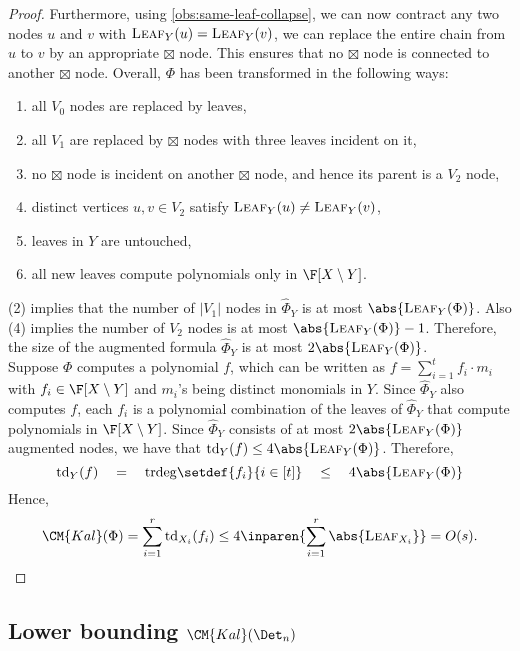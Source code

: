 \begin{proof}
Furthermore, using \autoref{obs:same-leaf-collapse}, we can now contract any two nodes $u$ and $v$ with $\textsc{Leaf}_Y(u) = \textsc{Leaf}_Y(v)$, we can replace the entire chain from $u$ to $v$ by an appropriate $\boxtimes$ node. 
This ensures that no $\boxtimes$ node is connected to another $\boxtimes$ node. 
Overall, $\Phi$ has been transformed in the following ways:
\begin{enumerate}
\itemsep 0pt
\item all $V_0$ nodes are replaced by leaves,
\item all $V_1$ are replaced by $\boxtimes$ nodes with three leaves incident on it,
\item no $\boxtimes$ node is incident on another $\boxtimes$ node, and hence its parent is a $V_2$ node,
\item distinct vertices $u,v\in V_2$ satisfy $\textsc{Leaf}_Y(u) \neq \textsc{Leaf}_Y(v)$, 
\item leaves in $Y$ are untouched,
\item all new leaves compute polynomials only in $\F[X \setminus Y]$.
\end{enumerate}
(2) implies that the number of $|V_1|$ nodes in $\hat{\Phi}_Y$ is at most $\abs{\textsc{Leaf}_Y(\Phi)}$.
Also (4) implies the number of $V_2$ nodes is at most $\abs{\textsc{Leaf}_Y(\Phi)} - 1$.
Therefore, the size of the augmented formula $\hat{\Phi}_Y$ is at most $2\abs{\textsc{Leaf}_Y(\Phi)}$.
\\

Suppose $\Phi$ computes a polynomial $f$, which can be written as $f = \sum_{i=1}^t f_i\cdot m_i$ with $f_i \in \F[X\setminus Y]$ and $m_i$'s being distinct monomials in $Y$.
Since $\hat{\Phi}_Y$ also computes $f$, each $f_i$ is a polynomial combination of the leaves of $\hat{\Phi}_Y$ that compute polynomials in $\F[X \setminus Y]$.
Since $\hat{\Phi}_Y$ consists of at most $2\abs{\textsc{Leaf}_Y(\Phi)}$ augmented nodes, we have that $\mathrm{td}_Y(f) \leq 4\abs{\textsc{Leaf}_Y(\Phi)}$.
Therefore,
$$
\mathrm{td}_Y(f) \quad=\quad \mathrm{trdeg}\setdef{f_i}{i\in [t]} \quad\leq\quad 4\abs{\textsc{Leaf}_Y(\Phi)}
$$
Hence, 
$$
\CM{Kal}(\Phi) = \sum_{i=1}^r \mathrm{td}_{X_i}(f_i) \leq 4\inparen{\sum_{i=1}^r \abs{\textsc{Leaf}_{X_i}}} = O(s).\qedhere
$$
\end{proof}

\subsection{Lower bounding $\CM{Kal}(\Det_n)$}



